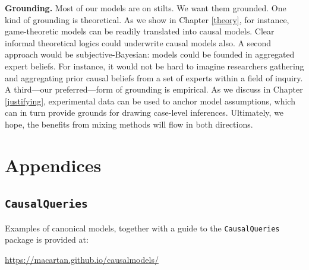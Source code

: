 \documentclass[
  12pt,
]{book}
\begin{document}
\textbf{Grounding.} Most of our models are on stilts. We want them grounded. One kind of grounding is theoretical. As we show in Chapter \ref{theory}, for instance, game-theoretic models can be readily translated into causal models. Clear informal theoretical logics could underwrite causal models also. A second approach would be subjective-Bayesian: models could be founded in aggregated expert beliefs. For instance, it would not be hard to imagine researchers gathering and aggregating prior causal beliefs from a set of experts within a field of inquiry. A third---our preferred---form of grounding is empirical. As we discuss in Chapter \ref{justifying}, experimental data can be used to anchor model assumptions, which can in turn provide grounds for drawing case-level inferences. Ultimately, we hope, the benefits from mixing methods will flow in both directions.

\hypertarget{part-appendices}{%
\part{Appendices}\label{part-appendices}}

\hypertarget{examplesappendix}{%
\chapter{\texorpdfstring{\texttt{CausalQueries}}{CausalQueries}}\label{examplesappendix}}

Examples of canonical models, together with a guide to the \texttt{CausalQueries} package is provided at:

\url{https://macartan.github.io/causalmodels/}

  
\end{document}
